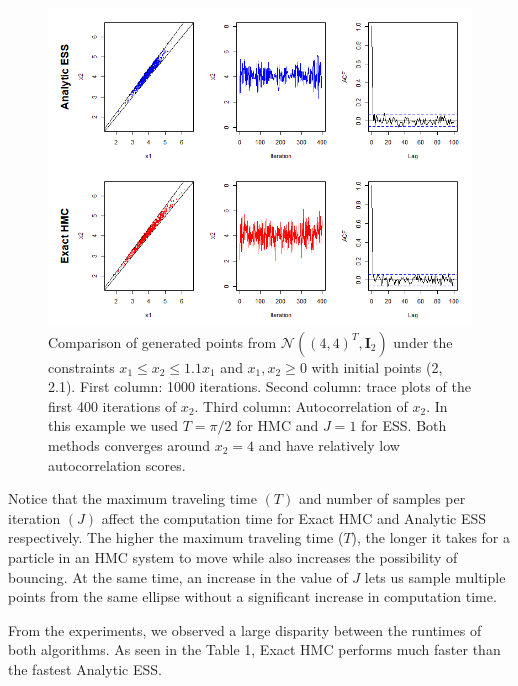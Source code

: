 \documentclass{scrartcl}
\numberwithin{equation}{section}
\begin{document}
\begin{figure}[h!]
	\includegraphics[width=\linewidth]{fig1.png}
	\caption{Comparison of generated points from $\mathcal{N}((4,4)^T,\textbf{I}_2)$ under the constraints $x_1 \leq x_2 \leq1.1 x_1$ and $x_1,x_2 \geq 0$ with initial points (2, 2.1). First column: 1000 iterations. Second column: trace plots of the first 400 iterations of $x_2$. Third column: Autocorrelation of $x_2$. In this example we used $T=\pi/2$ for HMC and $J=1$ for ESS. Both methods converges around $x_2=4$ and have relatively low autocorrelation scores.}
\end{figure}

Notice that the maximum traveling time $(T)$ and number of samples per iteration $(J)$ affect the computation time for Exact HMC and Analytic ESS respectively. The higher the maximum traveling time ($T$), the longer it takes for a particle in an HMC system to move while also increases the possibility of bouncing. At the same time, an increase in the value of $J$ lets us sample multiple points from the same ellipse without a significant increase in computation time.    


From the experiments, we observed a large disparity between the runtimes of both algorithms. As seen in the Table 1, Exact HMC performs much faster than the fastest Analytic ESS.     
\end{document}
